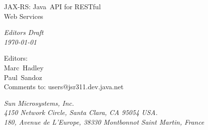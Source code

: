 \begin{titlepage}
\raggedleft

\vspace*{60pt}

{\Huge
\textsf{JAX-RS: Java\texttrademark\ API for RESTful\\\vspace{10pt}
 Web Services}}

\vspace{20pt}

{
\Large\textit{Editors Draft\\
\today}
}

\vspace{40pt}

{\large Editors:\\
Marc\ Hadley\\
Paul\ Sandoz\\
\vspace{10pt}Comments to: users@jsr311.dev.java.net
}

\vspace{80pt}

{\small\textit{Sun Microsystems, Inc.\\
4150 Network Circle, Santa Clara, CA 95054 USA.\\
180, Avenue de L'Europe, 38330 Montbonnot Saint Martin, France}
}
\end{titlepage} 
